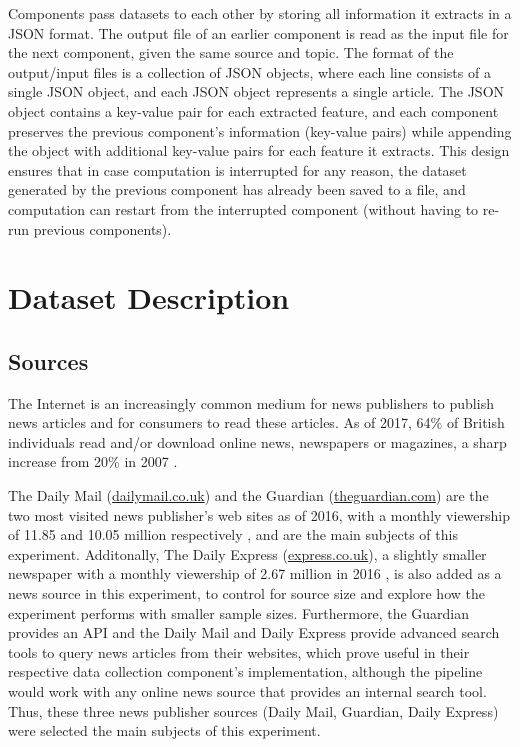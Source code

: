 \documentclass{report}
\begin{document}
Components pass datasets to each other by storing all information it extracts in a JSON format.
The output file of an earlier component is read as the input file for the next component, given the same source and topic.
The format of the output/input files is a collection of JSON objects, where each line consists of a single JSON object, and each JSON object represents a single article.
The JSON object contains a key-value pair for each extracted feature, and each component preserves the previous component's information (key-value pairs) while appending the object with additional key-value pairs for each feature it extracts.
This design ensures that in case computation is interrupted for any reason, the dataset generated by the previous component has already been saved to a file, and computation can restart from the interrupted component (without having to re-run previous components).

\section{Dataset Description} \label{Dataset Description}  %

\subsection{Sources} \label{sources}

The Internet is an increasingly common medium for news publishers to publish news articles and for consumers to read these articles.
As of 2017, 64\% of British individuals read and/or download online news, newspapers or magazines, a sharp increase from 20\% in 2007 \cite{statista2018share}. 

The Daily Mail (\url{dailymail.co.uk}) and the Guardian (\url{theguardian.com}) are the two most visited news publisher's web sites as of 2016, with a monthly viewership of 11.85 and 10.05 million respectively \cite{statista2018newspaper}, and are the main subjects of this experiment.
Additonally, The Daily Express (\url{express.co.uk}), a slightly smaller newspaper with a monthly viewership of 2.67 million in 2016 \cite{statista2018newspaper}, is also added as a news source in this experiment, to control for source size and explore how the experiment performs with smaller sample sizes.
Furthermore, the Guardian provides an API \cite{guardian} and the Daily Mail and Daily Express provide advanced search tools \cite{daily-mail, daily-express} to query news articles from their websites, which prove useful in their respective data collection component's implementation, although the pipeline would work with any online news source that provides an internal search tool.
Thus, these three news publisher sources (Daily Mail, Guardian, Daily Express) were selected the main subjects of this experiment.
\end{document}

